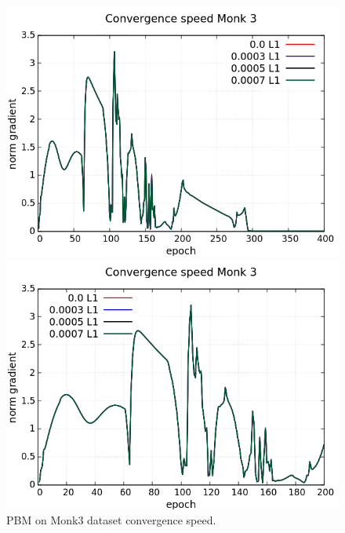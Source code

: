\begin{figure}[H]
	\centering
	\begin{minipage}[t]{0.5\linewidth}
		\includegraphics[width=\linewidth]{data/PBM/Monk3/Monk3_PBM_L1_CS_standard.png}
	\end{minipage}%
	\begin{minipage}[t]{0.5\linewidth}
		\includegraphics[width=\linewidth]{data/PBM/Monk3/Monk3_PBM_L1_CS_zoom.png}
	\end{minipage}
	\caption{PBM on Monk3 dataset convergence speed.}
\end{figure}
